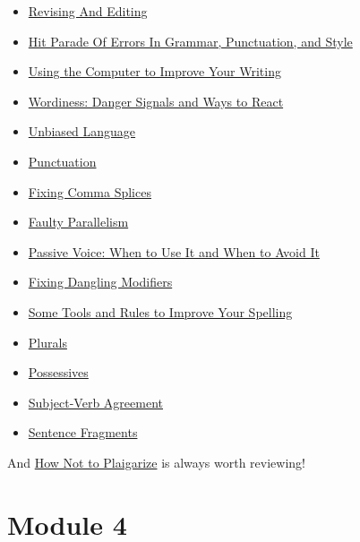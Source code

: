 \documentclass[
  openany]{book}
\begin{document}
\begin{itemize}
\item
  \href{https://advice.writing.utoronto.ca/revising/revising-and-editing/}{Revising And Editing}
\item
  \href{https://advice.writing.utoronto.ca/revising/hit-parade-of-errors/}{Hit Parade Of Errors In Grammar, Punctuation, and Style}
\item
  \href{https://advice.writing.utoronto.ca/revising/using-the-computer/}{Using the Computer to Improve Your Writing}
\item
  \href{https://advice.writing.utoronto.ca/revising/wordiness/}{Wordiness: Danger Signals and Ways to React}
\item
  \href{https://advice.writing.utoronto.ca/revising/unbiased-language/}{Unbiased Language}
\item
  \href{https://advice.writing.utoronto.ca/revising/punctuation/}{Punctuation}
\item
  \href{https://advice.writing.utoronto.ca/revising/comma-splices/}{Fixing Comma Splices}
\item
  \href{https://advice.writing.utoronto.ca/revising/faulty-parallelism/}{Faulty Parallelism}
\item
  \href{https://advice.writing.utoronto.ca/revising/passive-voice/}{Passive Voice: When to Use It and When to Avoid It}
\item
  \href{https://advice.writing.utoronto.ca/revising/dangling-modifiers/}{Fixing Dangling Modifiers}
\item
  \href{https://advice.writing.utoronto.ca/revising/spelling/}{Some Tools and Rules to Improve Your Spelling}
\item
  \href{https://advice.writing.utoronto.ca/revising/plurals/}{Plurals}
\item
  \href{https://advice.writing.utoronto.ca/revising/possessives/}{Possessives}
\item
  \href{https://advice.writing.utoronto.ca/revising/subject-verb-agreement/}{Subject-Verb Agreement}
\item
  \href{https://advice.writing.utoronto.ca/revising/sentence-fragments/}{Sentence Fragments}
\end{itemize}

And \href{https://advice.writing.utoronto.ca/using-sources/how-not-to-plagiarize/}{How Not to Plaigarize} is always worth reviewing!

\hypertarget{module-4}{%
\chapter{Module 4}\label{module-4}}
\end{document}
